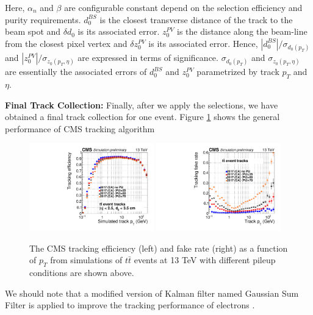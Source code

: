 Here, $\alpha_n$ and $\beta$ are configurable constant depend on the selection efficiency and purity requirements. $d_0^{BS}$ is the closest transverse distance of the track to the beam spot and $\delta d_0$ is its associated error. $z_0^{PV}$ is the distance along the beam-line from the closest pixel vertex and $\delta z_0^{PV}$ is its associated error. Hence, $|d_0^{BS}|/ \sigma_{d_0(p_T)}$ and $|z_0^{PV}|/ \sigma_{z_0(p_T,\eta)}$ are expressed in terms of significance. $\sigma_{d_0(p_T)}$ and $\sigma_{z_0(p_T,\eta)}$ are essentially the associated errors of $d_0^{BS}$ and $z_0^{PV}$ parametrized by track $p_T$ and $\eta$.


\textbf{Final Track Collection:}  Finally, after we apply the selections, we have obtained a final track collection for one event. Figure \ref{CMSTrackPer} shows the general performance of CMS tracking algorithm

\begin{figure}[hbtp]
\begin{center}
\includegraphics[width=0.48\textwidth]{Figures/Chapter4/TrackPTEff.pdf}
\includegraphics[width=0.48\textwidth]{Figures/Chapter4/TrackPTFake.pdf}
\caption{The CMS tracking efficiency (left) and fake rate (right) as a function of $p_T$ from simulations of $t \bar t$ events at 13 TeV with different pileup conditions are shown above.}
\label{CMSTrackPer}
\end{center}
\end{figure} 

We should note that a modified version of Kalman filter named Gaussian Sum Filter \cite{GSF} is applied to improve the tracking performance of electrons \cite{CMSTrackComp}.


